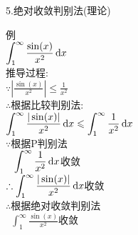 5.绝对收敛判别法(理论)
{\par\centering
{}
\par}
例\\
$\displaystyle\int_1^{\infty}\frac{\sin(x)}{x^2}\mathop{}\!\mathrm{d} x$\\
推导过程:\\
$\displaystyle\because|\frac{\sin(x)}{x^2}|\leqslant\frac{1}{x^2}$\\
$\therefore$根据比较判别法:\\
$\displaystyle\int_1^{\infty}\frac{|\sin(x)|}{x^2}\mathop{}\!\mathrm{d} x\leqslant\int_1^{\infty}\frac{1}{x^2}\mathop{}\!\mathrm{d} x$\\
$\because$根据P判别法\\
$\displaystyle\phantom{\because}\int_1^{\infty}\frac{1}{x^2}\mathop{}\!\mathrm{d} x$收敛\\[1ex]
$\displaystyle\therefore\int_1^{\infty}\frac{|\sin(x)|}{x^2}\mathop{}\!\mathrm{d} x$收敛\\
$\therefore$根据绝对收敛判别法\\
$\displaystyle\phantom{\therefore}\int_1^{\infty}\frac{\sin(x)}{x^2}$收敛
